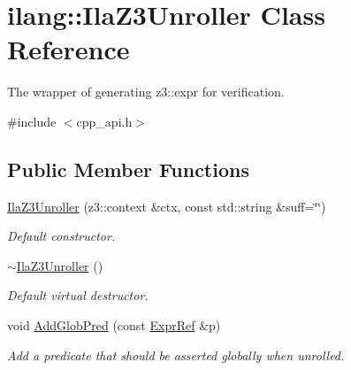 \hypertarget{classilang_1_1_ila_z3_unroller}{}\section{ilang\+:\+:Ila\+Z3\+Unroller Class Reference}
\label{classilang_1_1_ila_z3_unroller}


The wrapper of generating z3\+::expr for verification.  




{\ttfamily \#include $<$cpp\+\_\+api.\+h$>$}

\subsection*{Public Member Functions}
\begin{DoxyCompactItemize}
\item 
\mbox{\label{classilang_1_1_ila_z3_unroller_affa4fc33a5967452a797c37855251639}} 
\mbox{\hyperlink{classilang_1_1_ila_z3_unroller_affa4fc33a5967452a797c37855251639}{Ila\+Z3\+Unroller}} (z3\+::context \&ctx, const std\+::string \&suff=\char`\"{}\char`\"{})
\begin{DoxyCompactList}\small\item\em Default constructor. \end{DoxyCompactList}\item 
\mbox{\label{classilang_1_1_ila_z3_unroller_abd80acd14a4cfcab556002b5f3fad6ee}} 
\mbox{\hyperlink{classilang_1_1_ila_z3_unroller_abd80acd14a4cfcab556002b5f3fad6ee}{$\sim$\+Ila\+Z3\+Unroller}} ()
\begin{DoxyCompactList}\small\item\em Default virtual destructor. \end{DoxyCompactList}\item 
\mbox{\label{classilang_1_1_ila_z3_unroller_af4248271ac4b811ead52ac318bc675d7}} 
void \mbox{\hyperlink{classilang_1_1_ila_z3_unroller_af4248271ac4b811ead52ac318bc675d7}{Add\+Glob\+Pred}} (const \mbox{\hyperlink{classilang_1_1_expr_ref}{Expr\+Ref}} \&p)
\begin{DoxyCompactList}\small\item\em Add a predicate that should be asserted globally when unrolled. \end{DoxyCompactList}\item 

\end{DoxyCompactItemize}
